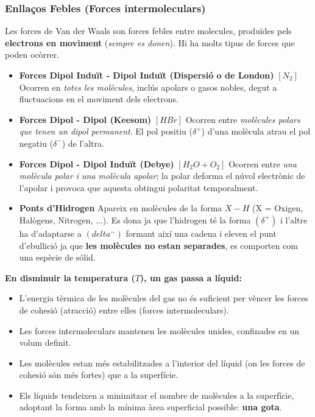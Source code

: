 \documentclass[12pt]{article}
\begin{document}
\subsubsection{Enllaços Febles (Forces intermoleculars)}

Les forces de Van der Waals son forces febles entre molecules, produïdes pels \textbf{electrons en moviment} (\textit{sempre es donen}). Hi ha molts tipus de forces que poden ocòrrer.

\begin{itemize}
    \item \textbf{Forces Dipol Induït - Dipol Induït (Dispersió o de London)} $[N_2]$
    Ocorren en \textit{totes les molècules}, inclús apolars o gasos nobles, degut a fluctuacions en el moviment dels electrons.
    \item \textbf{Forces Dipol - Dipol (Keesom)} $[HBr]$
    Ocorren entre \textit{molècules polars que tenen un dipol permanent}. El pol positiu ($\delta^+$) d'una molècula atrau el pol negatiu ($\delta^-$) de l'altra.
    \item \textbf{Forces Dipol - Dipol Induït (Debye)} $[H_2O + O_2]$
    Ocorren entre \textit{una molècula polar i una molècula apolar}; la polar deforma el núvol electrònic de l'apolar i provoca que aquesta obtingui polaritat temporalment.
    \item \textbf{Ponts d'Hidrogen} Apareix en molècules de la forma $X-H$ (X = Oxigen, Halògens, Nitrogen, ...). Es dona ja que l'hidrogen té la forma $(\delta^+)$ i l'altre ha d'adaptarse a $(delta^-)$ formant així una cadena i eleven el punt d'ebullició ja que \textbf{les molècules no estan separades}, es comporten com una espècie de sólid.
\end{itemize}

\begin{tcolorbox}[
    colback=white,      
    colframe=black,    
    coltext=black,     
    boxrule=1pt,        
    arc=0pt            
]
    \textbf{En disminuir la temperatura ($T$), un gas passa a líquid:}
    \begin{itemize}
        \item L'energia tèrmica de les molècules del gas no és suficient per vèncer les forces de cohesió (atracció) entre elles (forces intermoleculars).
        \item Les forces intermoleculars mantenen les molècules unides, confinades en un volum definit.
        \item Les molècules estan més estabilitzades a l'interior del líquid (on les forces de cohesió són més fortes) que a la superfície.
        \item Els líquids tendeixen a minimitzar el nombre de molècules a la superfície, adoptant la forma amb la mínima àrea superficial possible: \textbf{una gota}.
    \end{itemize}

\end{tcolorbox}
\end{document}
